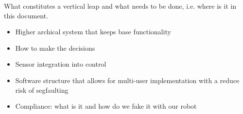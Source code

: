 What constitutes a vertical leap and what needs to be done, i.e. where is it in this document.
\begin{itemize}
\item Higher archical system that keeps base functionality
\item How to make the decisions
\item Sensor integration into control 
\item Software structure that allows for multi-user implementation with a reduce risk of segfaulting 
\item Compliance: what is it and how do we fake it with our robot
\end{itemize}
